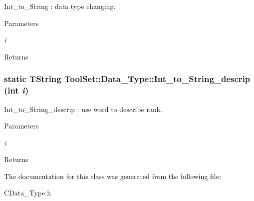 Int\_\-to\_\-String : data type changing. 
\begin{DoxyParams}{Parameters}
\item[{\em i}]\end{DoxyParams}
\begin{DoxyReturn}{Returns}

\end{DoxyReturn}
\hypertarget{classToolSet_1_1Data__Type_a4fc26a3b641aac7be524a433a382b441}{
\subsubsection[{Int\_\-to\_\-String\_\-descrip}]{\setlength{\rightskip}{0pt plus 5cm}static TString ToolSet::Data\_\-Type::Int\_\-to\_\-String\_\-descrip (int {\em i})}}
\label{classToolSet_1_1Data__Type_a4fc26a3b641aac7be524a433a382b441}


Int\_\-to\_\-String\_\-descrip : use word to describe rank. 
\begin{DoxyParams}{Parameters}
\item[{\em i}]\end{DoxyParams}
\begin{DoxyReturn}{Returns}

\end{DoxyReturn}


The documentation for this class was generated from the following file:\begin{DoxyCompactItemize}
\item 
CData\_\-Type.h\end{DoxyCompactItemize}
